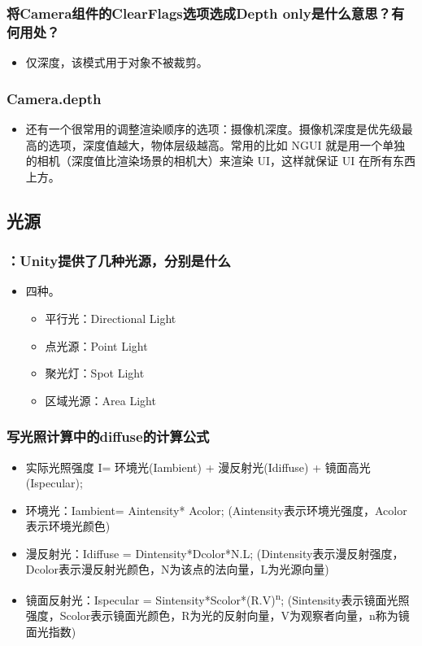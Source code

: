 \documentclass[9pt, b5paper]{article}
\begin{document}
\subsubsection{将Camera组件的ClearFlags选项选成Depth only是什么意思？有何用处？}
\label{sec:org49da2e4}
\begin{itemize}
\item 仅深度，该模式用于对象不被裁剪。
\end{itemize}
\subsubsection{Camera.depth}
\label{sec:orgbb17c7b}
\begin{itemize}
\item 还有一个很常用的调整渲染顺序的选项：摄像机深度。摄像机深度是优先级最高的选项，深度值越大，物体层级越高。常用的比如 NGUI 就是用一个单独的相机（深度值比渲染场景的相机大）来渲染 UI，这样就保证 UI 在所有东西上方。
\end{itemize}

\subsection{光源}
\label{sec:org1cd17ca}
\subsubsection{：Unity提供了几种光源，分别是什么}
\label{sec:org2af73b1}
\begin{itemize}
\item 四种。
\begin{itemize}
\item 平行光：Directional Light
\item 点光源：Point Light
\item 聚光灯：Spot Light
\item 区域光源：Area Light
\end{itemize}
\end{itemize}
\subsubsection{写光照计算中的diffuse的计算公式}
\label{sec:orga921b4d}
\begin{itemize}
\item 实际光照强度 I= 环境光(Iambient) + 漫反射光(Idiffuse) + 镜面高光(Ispecular);
\item 环境光：Iambient= Aintensity* Acolor; (Aintensity表示环境光强度，Acolor表示环境光颜色)
\item 漫反射光：Idiffuse = Dintensity*Dcolor*N.L; (Dintensity表示漫反射强度，Dcolor表示漫反射光颜色，N为该点的法向量，L为光源向量)
\item 镜面反射光：Ispecular = Sintensity*Scolor*(R.V)\textsuperscript{n}; (Sintensity表示镜面光照强度，Scolor表示镜面光颜色，R为光的反射向量，V为观察者向量，n称为镜面光指数)
\end{itemize}
\end{document}
